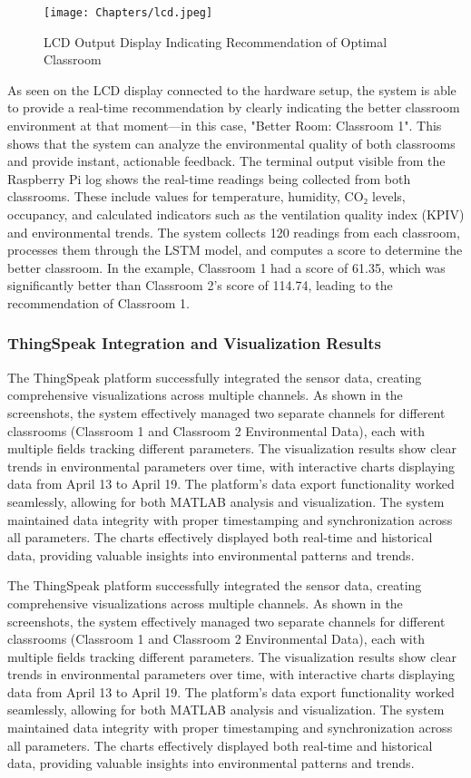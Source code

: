 \begin{figure}[h!]
		\centering
	\texttt{[image: Chapters/lcd.jpeg]}
		\caption{ LCD Output Display Indicating Recommendation of Optimal Classroom}
\end{figure}

As seen on the LCD display connected to the hardware setup, the system is able to provide a real-time recommendation by clearly indicating the better classroom environment at that moment—in this case, "Better Room: Classroom 1". This shows that the system can analyze the environmental quality of both classrooms and provide instant, actionable feedback. The terminal output visible from the Raspberry Pi log shows the real-time readings being collected from both classrooms. These include values for temperature, humidity, CO₂ levels, occupancy, and calculated indicators such as the ventilation quality index (KPIV) and environmental trends. The system collects 120 readings from each classroom, processes them through the LSTM model, and computes a score to determine the better classroom. In the example, Classroom 1 had a score of 61.35, which was significantly better than Classroom 2's score of 114.74, leading to the recommendation of Classroom 1.
\\
\subsubsection{ThingSpeak Integration and Visualization Results}
The ThingSpeak platform successfully integrated the sensor data, creating comprehensive visualizations across multiple channels. As shown in the screenshots, the system effectively managed two separate channels for different classrooms (Classroom 1 and Classroom 2 Environmental Data), each with multiple fields tracking different parameters. The visualization results show clear trends in environmental parameters over time, with interactive charts displaying data from April 13 to April 19. The platform's data export functionality worked seamlessly, allowing for both MATLAB analysis and visualization. The system maintained data integrity with proper timestamping and synchronization across all parameters. The charts effectively displayed both real-time and historical data, providing valuable insights into environmental patterns and trends.

The ThingSpeak platform successfully integrated the sensor data, creating comprehensive visualizations across multiple channels. As shown in the screenshots, the system effectively managed two separate channels for different classrooms (Classroom 1 and Classroom 2 Environmental Data), each with multiple fields tracking different parameters. The visualization results show clear trends in environmental parameters over time, with interactive charts displaying data from April 13 to April 19. The platform's data export functionality worked seamlessly, allowing for both MATLAB analysis and visualization. The system maintained data integrity with proper timestamping and synchronization across all parameters. The charts effectively displayed both real-time and historical data, providing valuable insights into environmental patterns and trends.

